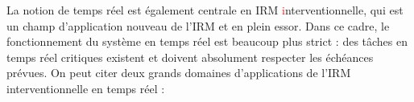 La notion de temps réel est également centrale en IRM \textcolor{red}{i}nterventionnelle, qui est un champ d’application nouveau de l’IRM et en plein essor. Dans ce cadre, le fonctionnement du système en temps réel est beaucoup plus strict : des tâches en temps réel critiques existent et doivent absolument respecter les échéances prévues. On peut citer deux grands domaines d’applications de l’IRM interventionnelle en temps réel :\\